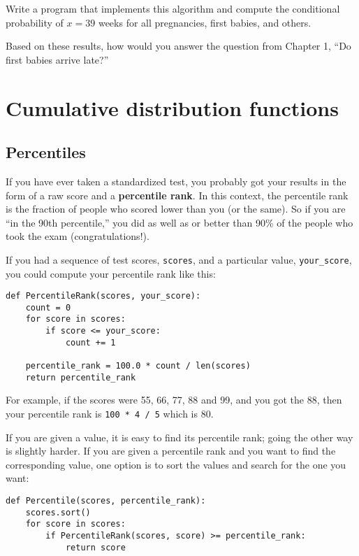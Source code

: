 \documentclass[10pt]{book}
\begin{document}
\begin{ex}
Write a program that implements this algorithm and compute the
conditional probability of $x = 39$ weeks for all pregnancies,
first babies, and others.

Based on these results, how would you answer the question
from Chapter 1, ``Do first babies arrive late?''
\end{ex}



\chapter{Cumulative distribution functions}

\section{Percentiles}

If you have ever taken a standardized test, you probably got your
results in the form of a raw score and a {\bf percentile rank}.
In this context, the percentile rank is the fraction of people who
scored lower than you (or the same).  So if you are ``in the 90th
percentile,'' you did as well as or better than 90\% of the people who
took the exam (congratulations!).

If you had a sequence of test scores, {\tt scores},
and a particular value, \verb"your_score", you could compute
your percentile rank like this:

\begin{verbatim}
def PercentileRank(scores, your_score):
    count = 0
    for score in scores:
        if score <= your_score:
            count += 1

    percentile_rank = 100.0 * count / len(scores)
    return percentile_rank
\end{verbatim}
%
%
For example, if the scores were 55, 66, 77, 88 and 99, and you got
the 88, then your percentile rank is {\tt 100 * 4 / 5} which is 80.

If you are given a value, it is easy to find its percentile rank; going
the other way is slightly harder.  If you are given a percentile rank
and you want to find the corresponding value, one option is to
sort the values and search for the one you want:

\begin{verbatim}
def Percentile(scores, percentile_rank):
    scores.sort()
    for score in scores:
        if PercentileRank(scores, score) >= percentile_rank:
            return score
\end{verbatim}
\end{document}
